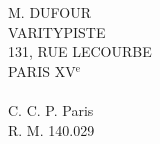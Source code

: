 \begin{center}
M. DUFOUR\\
VARITYPISTE\\
131, RUE LECOURBE\\
PARIS XV$^{\mathrm e}$\\
\\
C. C. P. Paris \\
R. M. 140.029
\end{center}

